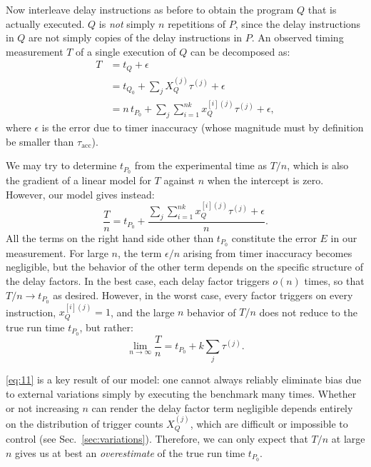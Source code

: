 \documentclass[conference]{IEEEtran}
\begin{document}
Now interleave delay instructions as before to obtain the program $Q$ that is
actually executed. $Q$ is \textit{not} simply $n$ repetitions of $P$, since the
delay instructions in
$Q$ are not simply copies of the delay instructions in $P$. An observed timing measurement
$T$ of a single execution of $Q$ can be decomposed as:
%
\begin{align}
    T &= t_{Q} + \epsilon \nonumber \\
      &= t_{Q_0} + \sum_{j} X_Q^{(j)} \tau^{(j)} + \epsilon \nonumber \\
      &= n \, t_{P_0} + \sum_{j} \sum_{i=1}^{nk} x_Q^{[i](j)} \tau^{(j)} + \epsilon,
\end{align}
%
where $\epsilon$ is the error due to timer inaccuracy (whose magnitude must by definition be smaller than $\tau_\textrm{acc}$).

We may try to determine $t_{P_0}$ from the experimental time as $T/n$, which is
also the gradient of a linear model for $T$ against $n$ when the intercept is
zero. However, our model gives instead:
%
\vspace{-0.10cm}
\begin{equation}
    \frac{T}{n} = t_{P_0} + \frac{\sum_{j} \sum_{i=1}^{nk} x_Q^{[i](j)} \tau^{(j)} + \epsilon}{n}.
\end{equation}
%
All the terms on the right hand side other than $t_{P_0}$ constitute the
error $E$ in our measurement. For large $n$, the term $\epsilon/n$ arising from
timer inaccuracy becomes negligible, but the behavior of the other term depends
on the specific structure of the delay factors. In the best case, each delay
factor triggers $o(n)$ times, so that $T/n\to t_{P_0}$ as desired. However, in
the worst case, every factor triggers on every instruction, $x_Q^{[i](j)}
= 1$, and the large $n$ behavior of $T/n$ does not reduce to the true run time
$t_{P_0}$, but rather:
%
\begin{equation}
\label{eq:11}
    \lim_{n\to\infty} \frac{T}{n} = t_{P_0} + k \sum_{j} \tau^{(j)}.
\end{equation}

\eqref{eq:11} is a key result of our model: one cannot always reliably
eliminate bias due to external variations simply by executing the benchmark
many times. Whether or not increasing $n$ can render the delay factor term
negligible depends entirely on the distribution of trigger counts $X_Q^{(j)}$,
which are difficult or impossible to control (see Sec.~\ref{sec:variations}).
Therefore, we can only expect that $T/n$ at large $n$ gives us at best an
\textit{overestimate} of the true run time $t_{P_0}$.
\end{document}

